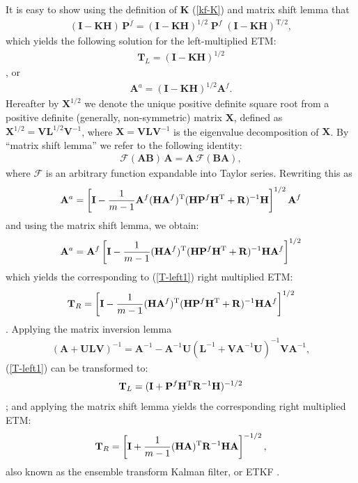 \documentclass[11pt]{report}
\newcommand{\mb} {\mathbf}
\newcommand{\T}{^{\tiny \mathrm T}}
\newcommand{\TS}{^{{\mathrm T}/2}}
\begin{document}
It is easy to show using the definition of $\mb K$ (\ref{kf-K}) and matrix shift lemma that 
\begin{align*}
    (\mb I - \mb K \mb H) \, \mb P^f = (\mb I - \mb K \mb H)^{1/2} \; \mb P^f \; (\mb I - \mb K \mb H)\TS,
\end{align*}
which yields the following solution for the left-multiplied ETM:
\begin{align}
  \label{T-left1}
  \mb T_L = (\mb I - \mb K \mb H)^{1/2}
\end{align}
\citep{sak08b}, or
\begin{align*}
  \mb A^a =  (\mb I - \mb K \mb H)^{1/2} \mb A^f.
\end{align*}
Hereafter by $\mb X^{1/2}$ we denote the unique positive definite square root from a positive definite (generally, non-symmetric) matrix $\mb X$, defined as $\mb X^{1/2} = \mb V \mb L^{1/2} \mb V^{-1}$, where $\mb X = \mb V \mb L \mb V^{-1}$ is the eigenvalue decomposition of $\mb X$.
By ``matrix shift lemma'' we refer to the following identity:
\begin{align}
  \label{shift}
  \mathcal F(\mb A \mb B) \, \mb A = \mb A \, \mathcal F(\mb B \mb A),
\end{align}
where $\mathcal F$ is an arbitrary function expandable into Taylor series.
Rewriting this as
\begin{align*}
  \mb A^a = \left[ \mb I - \frac{1}{m-1} \mb A^f (\mb H \mb A^f)\T  (\mb H \mb P^f \mb H\T + \mb R)^{-1} \mb H \right]^{1/2} \mb A^f
\end{align*}
and using the matrix shift lemma, we obtain:
\begin{align*}
  \mb A^a = \mb A^f \left[ \mb I - \frac{1}{m-1} (\mb H \mb A^f)\T  (\mb H \mb P^f \mb H\T + \mb R)^{-1} \mb H \mb A^f \right]^{1/2}
\end{align*}
which yields the corresponding to (\ref{T-left1}) right multiplied ETM:
\begin{align}
  \label{T-right1}
  \mb T_R = \left[ \mb I -  \frac{1}{m-1} (\mb H \mb A^f)\T  (\mb H \mb P^f \mb H\T + \mb R)^{-1} \mb H \mb A^f \right]^{1/2}
\end{align}
\citep{eve04a}.
Applying the matrix inversion lemma
\begin{align}
  \label{inv}
  (\mb A + \mb U \mb L \mb V)^{-1} = \mb A^{-1} - \mb A^{-1} \mb U (\mb L^{-1} + \mb V \mb A^{-1} \mb U)^{-1} \mb V \mb A^{-1},
\end{align}
(\ref{T-left1}) can be transformed to:
\begin{align}
  \label{T-left2}
  \mb T_L = (\mb I + \mb P^f \mb H\T \mb R^{-1} \mb H)^{-1/2}
\end{align}
\citep{sak11a}; and applying the matrix shift lemma yields the corresponding right multiplied ETM:
\begin{align}
  \label{etkf}
  \mb T_R = \left[\mb I +  \frac{1}{m-1} (\mb H \mb A)\T \mb R^{-1} \mb H \mb A\right]^{-1/2},
\end{align}
also known as the ensemble transform Kalman filter, or ETKF \citep{bis01a}.
\end{document}
